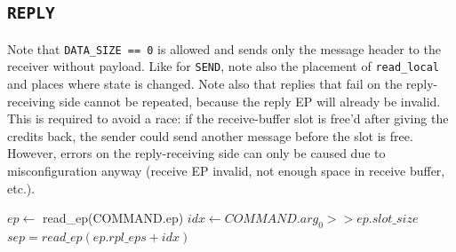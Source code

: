 \subsection{\texttt{REPLY}}

Note that \texttt{DATA\_SIZE == 0} is allowed and sends only the message header to the receiver
without payload. Like for \texttt{SEND}, note also the placement of \texttt{read\_local} and places
where state is changed. Note also that replies that fail on the reply-receiving side cannot be
repeated, because the reply EP will already be invalid. This is required to avoid a race: if the
receive-buffer slot is free'd after giving the credits back, the sender could send another message
before the slot is free. However, errors on the reply-receiving side can only be caused due to
misconfiguration anyway (receive EP invalid, not enough space in receive buffer, etc.). 

\begin{algorithm}
    $ep \gets$ read\_ep(COMMAND.ep)\;
    \extend{}
    \BlankLine
    $idx \gets COMMAND.arg_0 >> ep.slot\_size$\;
    $sep = read\_ep(ep.rpl\_eps + idx)$\;
    \extend{}
    \caption{The TCU's \texttt{REPLY} command.}
\end{algorithm}

